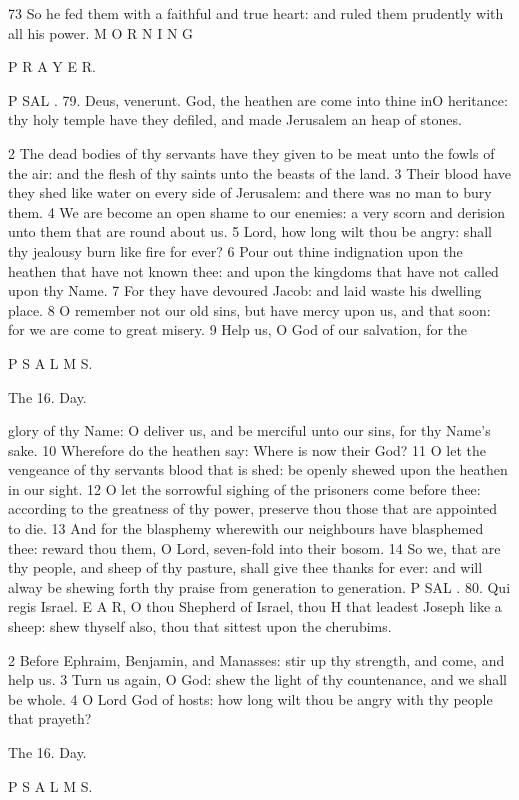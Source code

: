 73 So he fed them with a faithful and true heart: and ruled them prudently with all his power. M O R N I N G

P R A Y E R.

P SAL . 79. Deus, venerunt. God, the heathen are come into thine inO heritance: thy holy temple have they defiled, and made Jerusalem an heap of stones.

2 The dead bodies of thy servants have they given to be meat unto the fowls of the air: and the flesh of thy saints unto the beasts of the land. 3 Their blood have they shed like water on every side of Jerusalem: and there was no man to bury them. 4 We are become an open shame to our enemies: a very scorn and derision unto them that are round about us. 5 Lord, how long wilt thou be angry: shall thy jealousy burn like fire for ever? 6 Pour out thine indignation upon the heathen that have not known thee: and upon the kingdoms that have not called upon thy Name. 7 For they have devoured Jacob: and laid waste his dwelling place. 8 O remember not our old sins, but have mercy upon us, and that soon: for we are come to great misery. 9 Help us, O God of our salvation, for the

P S A L M S.

The 16. Day.

glory of thy Name: O deliver us, and be merciful unto our sins, for thy Name’s sake. 10 Wherefore do the heathen say: Where is now their God? 11 O let the vengeance of thy servants blood that is shed: be openly shewed upon the heathen in our sight. 12 O let the sorrowful sighing of the prisoners come before thee: according to the greatness of thy power, preserve thou those that are appointed to die. 13 And for the blasphemy wherewith our neighbours have blasphemed thee: reward thou them, O Lord, seven-fold into their bosom. 14 So we, that are thy people, and sheep of thy pasture, shall give thee thanks for ever: and will alway be shewing forth thy praise from generation to generation. P SAL . 80. Qui regis Israel. E A R, O thou Shepherd of Israel, thou H that leadest Joseph like a sheep: shew thyself also, thou that sittest upon the cherubims.

2 Before Ephraim, Benjamin, and Manasses: stir up thy strength, and come, and help us. 3 Turn us again, O God: shew the light of thy countenance, and we shall be whole. 4 O Lord God of hosts: how long wilt thou be angry with thy people that prayeth?

The 16. Day.

P S A L M S.

